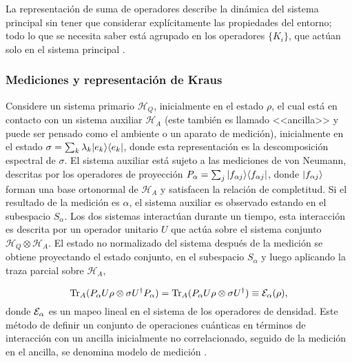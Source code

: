 La representación de suma de operadores describe la dinámica del sistema principal sin tener que considerar explícitamente las propiedades del entorno; todo lo que se necesita saber está agrupado en los operadores $\{K_i\}$, que actúan solo en el sistema principal {\cite{nielsen_chuang_2010}}.


\subsubsection{Mediciones y representación de Kraus}\label{Medicion_RepresentacionDeKraus} %

Considere un sistema primario $\mathcal{H}_Q$, inicialmente en el estado
$\rho$,  el cual está en contacto con un sistema auxiliar $\mathcal{H}_A$
(este también es llamado <<ancilla>> y puede ser pensado como el ambiente o un
aparato de medición), inicialmente en el estado $\sigma=\sum_k \lambda_k
|e_k\rangle \langle e_k|$, donde esta representación es la descomposición espectral de
$\sigma$. El sistema auxiliar está sujeto a las mediciones de von Neumann,
descritas por los operadores de proyección $P_\alpha=\sum_j |f_{\alpha j}\rangle \langle
f_{\alpha j}|$,  donde $|f_{\alpha j}\rangle$ forman una base ortonormal de
$\mathcal{H}_A$ y satisfacen la relación de completitud. Si el resultado de la
medición es $\alpha$, el sistema auxiliar es observado estando en el subespacio
$S_\alpha$. Los dos sistemas interactúan durante un tiempo, esta interacción es
descrita por un operador unitario $U$ que actúa sobre el sistema conjunto
$\mathcal{H}_Q\otimes \mathcal{H}_A$. El estado no normalizado del sistema
después de la medición se obtiene proyectando el estado conjunto, en el
subespacio $S_\alpha$ y luego aplicando la traza parcial sobre $\mathcal{H}_A$,

\begin{equation}\label{measurement_model}
    {\rm Tr}_A(P_\alpha U \rho \otimes \sigma U^\dagger P_\alpha)= {\rm Tr}_A(P_\alpha U \rho \otimes \sigma U^\dagger)\equiv \mathcal{E}_\alpha(\rho),
\end{equation} 
donde $\mathcal{E}_\alpha$ es un mapeo lineal en el sistema de los operadores de
densidad. Este método de definir un conjunto de operaciones cuánticas en
términos de interacción con un ancilla inicialmente no correlacionado, seguido
de la medición en el ancilla, se denomina modelo de medición {\cite{unm2014,
nielsen_chuang_2010}}.

